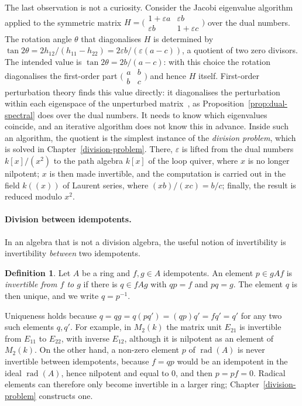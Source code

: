 \documentclass[12pt, a4paper]{report}
\theoremstyle{plain}
\theoremstyle{definition}
\newtheorem{definition}[theorem]{Definition}
\theoremstyle{remark}
\theoremstyle{plain}
\newcommand{\rad}[0]{\operatorname{rad}} %
\begin{document}
The last observation is not a curiosity. Consider the Jacobi eigenvalue algorithm~\cite{GolubVanLoan2013} applied to the symmetric matrix $H=\bigl(\begin{smallmatrix}1+\varepsilon a&\varepsilon b\\ \varepsilon b&1+\varepsilon c\end{smallmatrix}\bigr)$ over the dual numbers. The rotation angle $\theta$ that diagonalises $H$ is determined by $\tan 2\theta=2h_{12}/(h_{11}-h_{22})=2\varepsilon b/(\varepsilon(a-c))$, a quotient of two zero divisors. The intended value is $\tan2\theta=2b/(a-c)$: with this choice the rotation diagonalises the first-order part $\bigl(\begin{smallmatrix}a&b\\ b&c\end{smallmatrix}\bigr)$ and hence $H$ itself. First-order perturbation theory finds this value directly: it diagonalises the perturbation within each eigenspace of the unperturbed matrix~\cite{Kato1995}, as Proposition~\ref{prop:dual-spectral} does over the dual numbers. It needs to know which eigenvalues coincide, and an iterative algorithm does not know this in advance. Inside such an algorithm, the quotient is the simplest instance of the \emph{division problem}, which is solved in Chapter~\ref{division-problem}. There, $\varepsilon$ is lifted from the dual numbers $k[x]/(x^2)$ to the path algebra $k[x]$ of the loop quiver, where $x$ is no longer nilpotent; $x$ is then made invertible, and the computation is carried out in the field $k((x))$ of Laurent series, where $(xb)/(xc)=b/c$; finally, the result is reduced modulo $x^2$.

\paragraph{Division between idempotents.} In an algebra that is not a division algebra, the useful notion of invertibility is invertibility \emph{between} two idempotents.

\begin{definition}\label{def:invertible-between}
Let $A$ be a ring and $f,g\in A$ idempotents. An element $p\in gAf$ is \emph{invertible from $f$ to $g$} if there is $q\in fAg$ with $qp=f$ and $pq=g$. The element $q$ is then unique, and we write $q=p^{-1}$.
\end{definition}

Uniqueness holds because $q=qg=q(pq')=(qp)q'=fq'=q'$ for any two such elements $q,q'$. For example, in $M_2(k)$ the matrix unit $E_{21}$ is invertible from $E_{11}$ to $E_{22}$, with inverse $E_{12}$, although it is nilpotent as an element of $M_2(k)$. On the other hand, a non-zero element $p$ of $\rad(A)$ is never invertible between idempotents, because $f=qp$ would be an idempotent in the ideal $\rad(A)$, hence nilpotent and equal to $0$, and then $p=pf=0$. Radical elements can therefore only become invertible in a larger ring; Chapter~\ref{division-problem} constructs one.
\end{document}
